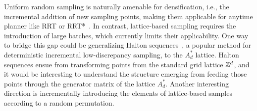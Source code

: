  Uniform random sampling is naturally amenable for densification, i.e., the incremental addition of new sampling points, making them applicable for anytime planner like RRT or RRT*~\cite{LaVKuf01,karaman2011sampling}. In contrast, lattice-based sampling requires the introduction of large batches, which currently limits their applicability. One way to bridge this gap could be generalizing Halton sequences~\cite{kuipers2012uniform}, a popular method for deterministic incremental low-discrepancy sampling, to the $A^*_d$ lattice. Halton sequences ensue from transforming points from the standard grid lattice $\mathbb{Z}^d$, and it would be interesting to understand the structure emerging from feeding those points through the generator matrix of the lattice $A^*_d$. Another interesting direction is incrementally introducing the elements of lattice-based samples according to a random permutation.

 












